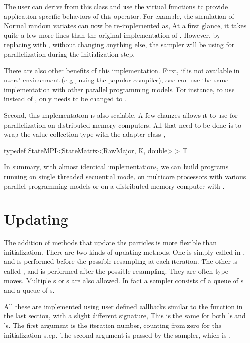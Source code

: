 The user can derive from this class and use the virtual functions to provide application specific behaviors of this operator. For example, the simulation of Normal random variates can now be re-implemented as,
At a first glance, it takes quite a few more lines than the original implementation of . However, by replacing  with , without changing anything else, the sampler will be using \openmp for parallelization during the initialization step.

There are also other benefits of this implementation. First, if \openmp is not available in users' \cpp environment (e.g., using the popular \clang \cite{clang} compiler), one can use the same implementation with other parallel programming models. For instance, to use \tbb instead of \openmp, only  needs to be changed to .

Second, this implementation is also scalable. A few changes allows it to use \mpi for parallelization on distributed memory computers. All that need to be done is to wrap the value collection type with the adapter class
,
\begin{cppcode}
typedef StateMPI<StateMatrix<RawMajor, K, double> > T
\end{cppcode}

In summary, with almost identical implementations, we can build programs running on single threaded sequential mode, on multicore processors with various parallel programming models or on a distributed memory computer with \mpi.

\section{Updating}
\label{sec:Updating}

The addition of methods that update the particles is more flexible than initialization. There are two kinds of updating methods. One is simply called  in \vsmc, and is performed before the possible resampling at each iteration. The other is called , and is performed after the possible resampling. They are often \mcmc type moves. Multiple s or s are also allowed. In fact a \vsmc sampler consists of a queue of s and a queue of s.

All these are implemented using user defined callbacks similar to the  function in the last section, with a slight different signature,
This is the same for both 's and 's. The first argument is the iteration number, counting from zero for the initialization step. The second argument is passed by the sampler, which is .

